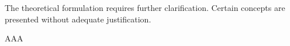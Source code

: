 \begin{point}
	The theoretical formulation requires further clarification. Certain concepts are presented without adequate justification.
\end{point}

\begin{reply}
	AAA
\end{reply}

